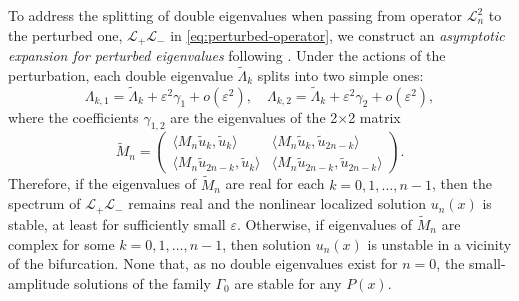 To address the splitting of double eigenvalues when passing from operator $\mathcal{L}_n^2$ to the perturbed one, $\mathcal{L}_+ \mathcal{L}_-$ in \eqref{eq:perturbed-operator}, we construct an {\it asymptotic expansion for perturbed eigenvalues} following \cite{ZezyulinAlfimovKonotopPerecGarcia2008}.
Under the actions of the perturbation, each double eigenvalue $\widetilde{\Lambda}_k$ splits into two simple ones:
\begin{equation}
	\Lambda_{k, 1} = \widetilde{\Lambda}_k + \varepsilon^2 \gamma_1 + o(\varepsilon^2), \quad \Lambda_{k, 2} = \widetilde{\Lambda}_k + \varepsilon^2 \gamma_2 + o(\varepsilon^2),
\label{eq:eigenvalues-split}
\end{equation}
where the coefficients $\gamma_{1,2}$ are the eigenvalues of the 2$\times$2 matrix
\begin{equation}
	\widetilde{M}_n =
	\begin{pmatrix}
		\langle M_n \tilde{u}_k, \tilde{u}_k \rangle & \langle M_n \tilde{u}_k, \tilde{u}_{2n - k} \rangle \\
		\langle M_n \tilde{u}_{2n - k}, \tilde{u}_k \rangle & \langle M_n \tilde{u}_{2n - k}, \tilde{u}_{2n - k} \rangle
	\end{pmatrix}.
\label{eq:M}
\end{equation}
Therefore, if the eigenvalues of $\widetilde{M}_n$ are real for each $k = 0, 1, \dots, n - 1$, then the spectrum of $\mathcal{L}_+ \mathcal{L}_-$ remains real and the nonlinear localized solution $u_n(x)$ is stable, at least for sufficiently small $\varepsilon$.
Otherwise, if eigenvalues of $\widetilde{M}_n$ are complex for some $k = 0, 1, \dots, n - 1$, then solution $u_n(x)$ is unstable in a vicinity of the bifurcation.
None that, as no double eigenvalues exist for $n = 0$, the small-amplitude solutions of the family $\Gamma_0$ are stable for any $P(x)$.


